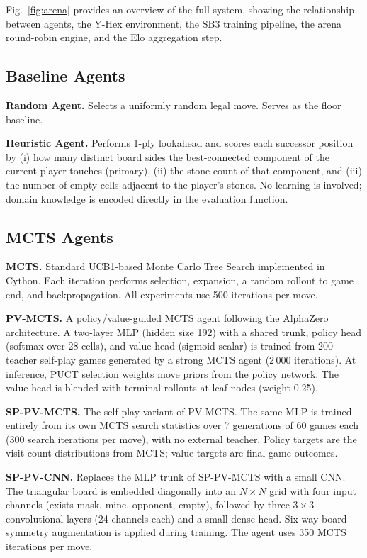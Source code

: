 \documentclass[conference]{IEEEtran}
\begin{document}
Fig.~\ref{fig:arena} provides an overview of the full system, showing the
relationship between agents, the Y-Hex environment, the SB3 training pipeline,
the arena round-robin engine, and the Elo aggregation step.

\subsection{Baseline Agents}

\textbf{Random Agent.} Selects a uniformly random legal move. Serves as the
floor baseline.

\textbf{Heuristic Agent.} Performs 1-ply lookahead and scores each successor
position by (i) how many distinct board sides the best-connected component of the
current player touches (primary), (ii) the stone count of that component, and
(iii) the number of empty cells adjacent to the player's stones. No learning
is involved; domain knowledge is encoded directly in the evaluation function.

\subsection{MCTS Agents}

\textbf{MCTS.} Standard UCB1-based Monte Carlo Tree Search implemented in Cython.
Each iteration performs selection, expansion, a random rollout to game end, and
backpropagation. All experiments use 500 iterations per move.

\textbf{PV-MCTS.} A policy/value-guided MCTS agent following the AlphaZero
architecture. A two-layer MLP (hidden size 192) with a shared trunk, policy head
(softmax over 28 cells), and value head (sigmoid scalar) is trained from 200
teacher self-play games generated by a strong MCTS agent (2\,000 iterations). At
inference, PUCT selection weights move priors from the policy network. The value
head is blended with terminal rollouts at leaf nodes (weight 0.25).

\textbf{SP-PV-MCTS.} The self-play variant of PV-MCTS. The same MLP is trained
entirely from its own MCTS search statistics over 7 generations of 60 games each
(300 search iterations per move), with no external teacher. Policy targets are the
visit-count distributions from MCTS; value targets are final game outcomes.

\textbf{SP-PV-CNN.} Replaces the MLP trunk of SP-PV-MCTS with a small CNN.
The triangular board is embedded diagonally into an $N \times N$ grid with four
input channels (exists mask, mine, opponent, empty), followed by three
$3 \times 3$ convolutional layers (24 channels each) and a small dense head.
Six-way board-symmetry augmentation is applied during training. The agent uses
350 MCTS iterations per move.
\end{document}
